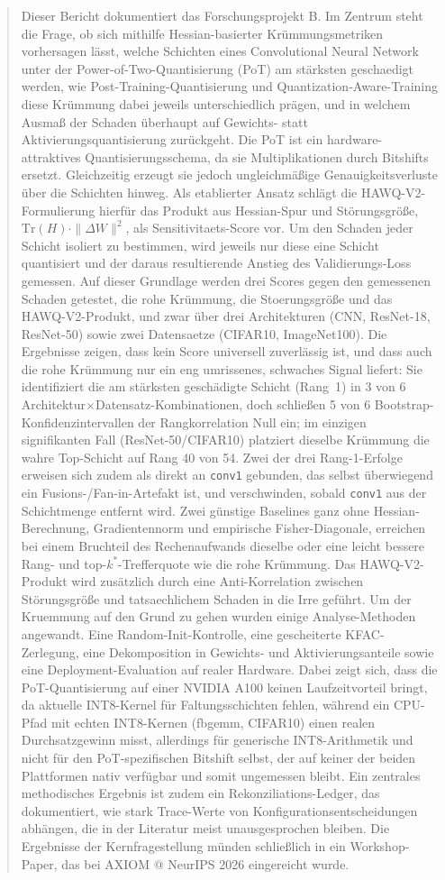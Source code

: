 \begin{abstract}
\noindent
Dieser Bericht dokumentiert das Forschungsprojekt B. Im Zentrum steht die Frage, ob sich mithilfe Hessian-basierter Krümmungsmetriken vorhersagen lässt, welche Schichten eines Convolutional Neural Network unter der Power-of-Two-Quantisierung (PoT) am stärksten geschaedigt werden, wie Post-Training-Quantisierung und Quantization-Aware-Training diese Krümmung dabei jeweils unterschiedlich prägen, und in welchem Ausmaß der Schaden überhaupt auf Gewichts- statt Aktivierungsquantisierung zurückgeht. Die PoT ist ein hardware-attraktives Quantisierungsschema, da sie Multiplikationen durch Bitshifts ersetzt. Gleichzeitig erzeugt sie jedoch ungleichmäßige Genauigkeitsverluste über die Schichten hinweg. Als etablierter Ansatz schlägt die HAWQ-V2-Formulierung hierfür das Produkt aus Hessian-Spur und Störungsgröße, $\mathrm{Tr}(H)\cdot\|\Delta W\|^2$, als Sensitivitaets-Score vor. Um den Schaden jeder Schicht isoliert zu bestimmen, wird jeweils nur diese eine Schicht quantisiert und der daraus resultierende Anstieg des Validierungs-Loss gemessen. Auf dieser Grundlage werden drei Scores gegen den gemessenen Schaden getestet, die rohe Krümmung, die Stoerungsgröße und das HAWQ-V2-Produkt, und zwar über drei Architekturen (CNN, ResNet-18, ResNet-50) sowie zwei Datensaetze (CIFAR10, ImageNet100). Die Ergebnisse zeigen, dass kein Score universell zuverlässig ist, und dass auch die rohe Krümmung nur ein eng umrissenes, schwaches Signal liefert: Sie identifiziert die am stärksten geschädigte Schicht (Rang~1) in 3 von 6 Architektur$\times$Datensatz-Kombinationen, doch schließen 5 von 6 Bootstrap-Konfidenzintervallen der Rangkorrelation Null ein; im einzigen signifikanten Fall (ResNet-50/CIFAR10) platziert dieselbe Krümmung die wahre Top-Schicht auf Rang 40 von 54. Zwei der drei Rang-1-Erfolge erweisen sich zudem als direkt an \texttt{conv1} gebunden, das selbst überwiegend ein Fusions-/Fan-in-Artefakt ist, und verschwinden, sobald \texttt{conv1} aus der Schichtmenge entfernt wird. Zwei günstige Baselines ganz ohne Hessian-Berechnung, Gradientennorm und empirische Fisher-Diagonale, erreichen bei einem Bruchteil des Rechenaufwands dieselbe oder eine leicht bessere Rang- und top-$k^*$-Trefferquote wie die rohe Krümmung. Das HAWQ-V2-Produkt wird zusätzlich durch eine Anti-Korrelation zwischen Störungsgröße und tatsaechlichem Schaden in die Irre geführt. Um der Kruemmung auf den Grund zu gehen wurden einige Analyse-Methoden angewandt. Eine Random-Init-Kontrolle, eine gescheiterte KFAC-Zerlegung, eine Dekomposition in Gewichts- und Aktivierungsanteile sowie eine Deployment-Evaluation auf realer Hardware. Dabei zeigt sich, dass die PoT-Quantisierung auf einer NVIDIA A100 keinen Laufzeitvorteil bringt, da aktuelle INT8-Kernel für Faltungsschichten fehlen, während ein CPU-Pfad mit echten INT8-Kernen (fbgemm, CIFAR10) einen realen Durchsatzgewinn misst, allerdings für generische INT8-Arithmetik und nicht für den PoT-spezifischen Bitshift selbst, der auf keiner der beiden Plattformen nativ verfügbar und somit ungemessen bleibt. Ein zentrales methodisches Ergebnis ist zudem ein Rekonziliations-Ledger, das dokumentiert, wie stark Trace-Werte von Konfigurationsentscheidungen abhängen, die in der Literatur meist unausgesprochen bleiben. Die Ergebnisse der Kernfragestellung münden schließlich in ein Workshop-Paper, das bei AXIOM @ NeurIPS 2026 eingereicht wurde.
\end{abstract}